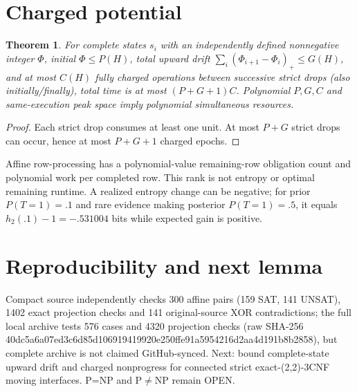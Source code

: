 \documentclass{article}
\newtheorem{theorem}{Theorem}
\begin{document}
\section{Charged potential}
\begin{theorem}
For complete states $s_i$ with an independently defined nonnegative integer $\Phi$, initial $\Phi\le P(H)$, total upward drift $\sum_i(\Phi_{i+1}-\Phi_i)_+\le G(H)$, and at most $C(H)$ fully charged operations between successive strict drops (also initially/finally), total time is at most $(P+G+1)C$. Polynomial $P,G,C$ and same-execution peak space imply polynomial simultaneous resources.
\end{theorem}
\begin{proof}
Each strict drop consumes at least one unit. At most $P+G$ strict drops can occur, hence at most $P+G+1$ charged epochs.
\end{proof}
Affine row-processing has a polynomial-value remaining-row obligation count and polynomial work per completed row. This rank is not entropy or optimal remaining runtime. A realized entropy change can be negative; for prior $P(T=1)=.1$ and rare evidence making posterior $P(T=1)=.5$, it equals $h_2(.1)-1=-.531004$ bits while expected gain is positive.
\section{Reproducibility and next lemma}
Compact source independently checks 300 affine pairs (159 SAT, 141 UNSAT), 1402 exact projection checks and 141 original-source XOR contradictions; the full local archive tests 576 cases and 4320 projection checks (raw SHA-256 40dc5a6a07ed3c6d85d106919419920e250ffe91a5954216d2aa4d191b8b2858), but complete archive is not claimed GitHub-synced. Next: bound complete-state upward drift and charged nonprogress for connected strict exact-(2,2)-3CNF moving interfaces. P=NP and P$\ne$NP remain OPEN.
\end{document}
